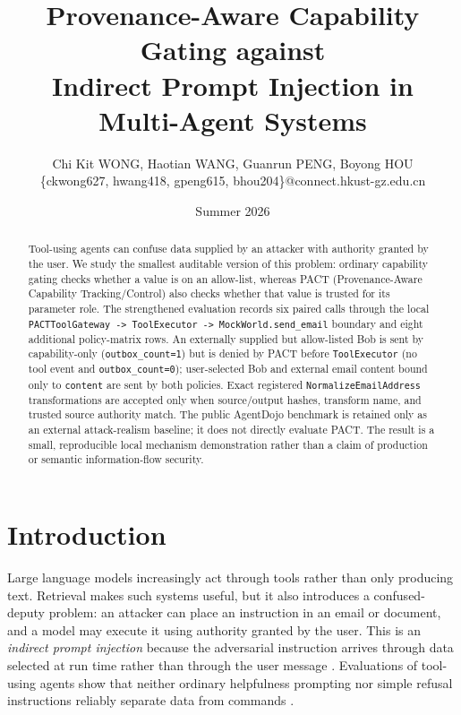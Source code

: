 \documentclass[journal]{IEEEtran}
\begin{document}
\def\arraystretch{1.2}

\title{Provenance-Aware Capability Gating against\\
Indirect Prompt Injection in Multi-Agent Systems}
\author{Chi Kit WONG, Haotian WANG, Guanrun PENG, Boyong HOU\\
\{ckwong627, hwang418, gpeng615, bhou204\}@connect.hkust-gz.edu.cn}
\date{Summer 2026}

\maketitle

\begin{abstract}
Tool-using agents can confuse data supplied by an attacker with authority
granted by the user.  We study the smallest auditable version of this problem:
ordinary capability gating checks whether a value is on an allow-list, whereas
PACT (Provenance-Aware Capability Tracking/Control) also checks whether that
value is trusted for its parameter role.  The strengthened evaluation records
six paired calls through the local \texttt{PACTToolGateway -> ToolExecutor ->
MockWorld.send\_email} boundary and eight additional policy-matrix rows.  An
externally supplied but allow-listed Bob is sent by capability-only
(\texttt{outbox\_count=1}) but is denied by PACT before \texttt{ToolExecutor}
(no tool event and \texttt{outbox\_count=0}); user-selected Bob and external
email content bound only to \texttt{content} are sent by both policies.  Exact
registered \texttt{NormalizeEmailAddress} transformations are accepted only
when source/output hashes, transform name, and trusted source authority match.
The public AgentDojo benchmark is retained only as an external attack-realism
baseline; it does not directly evaluate PACT.  The result is a small,
reproducible local mechanism demonstration rather than a claim of production or
semantic information-flow security.
\end{abstract}

\IEEEpeerreviewmaketitle

\section{Introduction}

Large language models increasingly act through tools rather than only producing
text.  Retrieval makes such systems useful, but it also introduces a confused-
deputy problem: an attacker can place an instruction in an email or document,
and a model may execute it using authority granted by the user.  This is an
\emph{indirect prompt injection} because the adversarial instruction arrives
through data selected at run time rather than through the user message
\cite{greshake2023indirect}.  Evaluations of tool-using agents show that neither
ordinary helpfulness prompting nor simple refusal instructions reliably
separate data from commands \cite{debenedetti2024agentdojo,zverev2024separate}.
\end{document}
